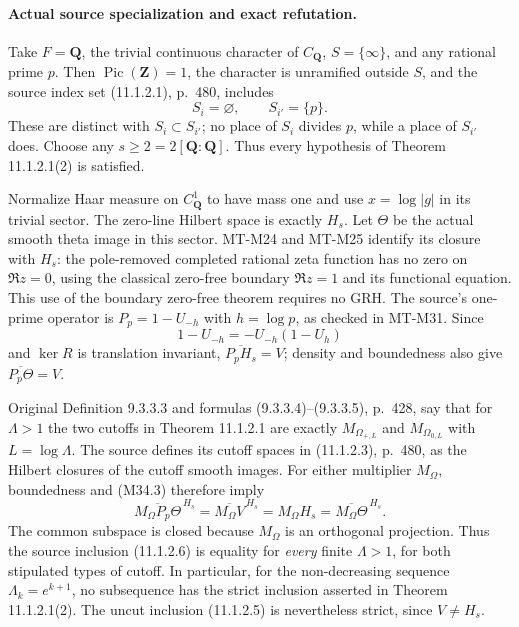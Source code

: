 \paragraph{Actual source specialization and exact refutation.}
Take $F=\mathbf Q$, the trivial continuous character of
$C_{\mathbf Q}$, $S=\{\infty\}$, and any rational prime
$p$.  Then $\operatorname{Pic}(\mathbf Z)=1$, the character
is unramified outside $S$, and the source index set
(11.1.2.1), p.~480, includes
\[
                         S_i=\varnothing,
                         \qquad S_{i'}=\{p\}.
 \tag{M34.21}
\]
These are distinct with $S_i\subset S_{i'}$; no place
of $S_i$ divides $p$, while a place of $S_{i'}$ does.
Choose any $s\ge2=2[\mathbf Q:\mathbf Q]$.
Thus every hypothesis of Theorem 11.1.2.1(2) is satisfied.

Normalize Haar measure on $C_{\mathbf Q}^1$ to have
mass one and use $x=\log|g|$ in its trivial sector.
The zero-line Hilbert space is exactly $H_s$.
Let $\Theta$ be the actual smooth theta image in this
sector.  MT-M24 and MT-M25 identify its closure with
$H_s$: the pole-removed completed rational zeta function
has no zero on $\Re z=0$, using the classical zero-free
boundary $\Re z=1$ and its functional equation.
This use of the boundary zero-free theorem requires no
GRH.  The source's one-prime operator is
$P_p=1-U_{-h}$ with $h=\log p$, as checked in MT-M31.
Since
\[
                    1-U_{-h}=-U_{-h}(1-U_h)
 \tag{M34.22}
\]
and $\ker R$ is translation invariant,
$\overline{P_pH_s}=V$; density and boundedness also give
$\overline{P_p\Theta}=V$.

Original Definition 9.3.3.3 and formulas
(9.3.3.4)--(9.3.3.5), p.~428, say that for $\Lambda>1$
the two cutoffs in Theorem 11.1.2.1 are exactly
$M_{\Omega_{+,L}}$ and $M_{\Omega_{0,L}}$ with
$L=\log\Lambda$.  The source defines its cutoff spaces
in (11.1.2.3), p.~480, as the Hilbert closures of the
cutoff smooth images.  For either multiplier $M_\Omega$,
boundedness and (M34.3) therefore imply
\[
 \overline{M_\Omega P_p\Theta}^{\,H_s}
       =\overline{M_\Omega V}^{\,H_s}
       =M_\Omega H_s
       =\overline{M_\Omega\Theta}^{\,H_s}.
 \tag{M34.23}
\]
The common subspace is closed because $M_\Omega$ is an
orthogonal projection.  Thus the source inclusion
(11.1.2.6) is equality for \emph{every} finite $\Lambda>1$,
for both stipulated types of cutoff.  In particular, for
the non-decreasing sequence $\Lambda_k=e^{k+1}$, no
subsequence has the strict inclusion asserted in
Theorem 11.1.2.1(2).  The uncut inclusion (11.1.2.5)
is nevertheless strict, since $V\ne H_s$.

